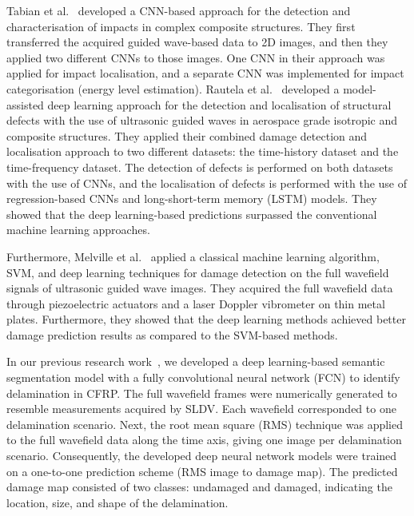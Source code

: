\begin{sloppypar}
	Tabian et al.~\cite{Tabian2019} developed a CNN-based approach for the detection and characterisation of impacts in complex composite structures.
	They first transferred the acquired guided wave-based data to 2D images, and then they applied two different CNNs to those images.
	One CNN in their approach was applied for impact localisation, and a separate CNN was implemented for impact categorisation (energy level estimation).
	Rautela et al.~\cite{rautela2021ultrasonic} developed a model-assisted deep learning approach for the detection and localisation of structural defects with the use of ultrasonic guided waves in aerospace grade isotropic and composite structures. 
	They applied their combined damage detection and localisation approach to two different datasets: the time-history dataset and the time-frequency dataset. 
	The detection of defects is performed on both datasets with the use of CNNs, and the localisation of defects is performed with the use of regression-based CNNs and long-short-term memory (LSTM) models. 
	They showed that the deep learning-based predictions surpassed the conventional machine learning approaches.
	
	Furthermore, Melville et al.~\cite{Melville2018} applied a classical machine learning algorithm, SVM, and deep learning techniques for damage detection on the full wavefield signals of ultrasonic guided wave images.
	They acquired the full wavefield data through piezoelectric actuators and a laser Doppler vibrometer on thin metal plates.
	Furthermore, they showed that the deep learning methods achieved better damage prediction results as compared to the SVM-based methods.
	
	In our previous research work~\cite{Ijjeh2021}, we developed a deep learning-based semantic segmentation model with a fully convolutional neural network (FCN) to identify delamination in CFRP.
	The full wavefield frames were numerically generated to resemble measurements acquired by SLDV.
	Each wavefield corresponded to one delamination scenario.
	Next, the root mean square (RMS) technique was applied to the full wavefield data along the time axis, giving one image per delamination scenario.
	Consequently, the developed deep neural network models were trained on a one-to-one prediction scheme (RMS image to damage map).
	The predicted damage map consisted of two classes: undamaged and damaged, indicating the location, size, and shape of the delamination.
	

\end{sloppypar}
